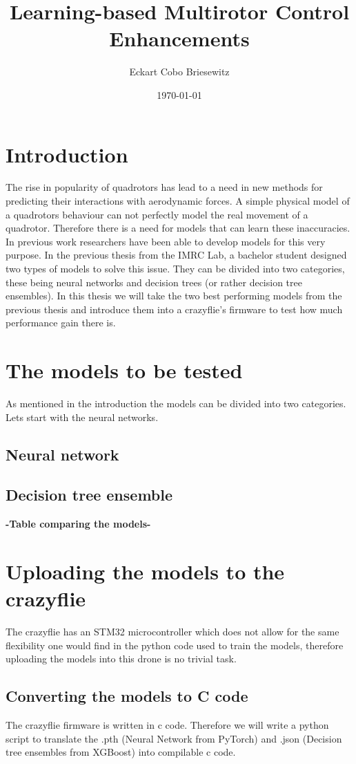 \documentclass[11pt]{article}
\title{ Learning-based Multirotor Control Enhancements }
\author{ Eckart Cobo Briesewitz }
\date{\today}
\begin{document}
\maketitle
\pagebreak


\section{Introduction}
The rise in popularity of quadrotors has lead to a need in new methods for predicting their interactions with aerodynamic forces. A simple physical model of a quadrotors behaviour can not perfectly model the real movement of a quadrotor. Therefore there is a need for models that can learn these inaccuracies. In previous work researchers have been able to develop models for this very purpose. In the previous thesis from the IMRC Lab, a bachelor student designed two types of models to solve this issue. They can be divided into two categories, these being neural networks and decision trees (or rather decision tree ensembles). In this thesis we will take the two best performing models from the previous thesis and introduce them into a crazyflie's firmware to test how much performance gain there is.

\section{The models to be tested}
As mentioned in the introduction the models can be divided into two categories. Lets start with the neural networks.
\subsection{Neural network}
\subsection{Decision tree ensemble}

\textbf{-Table comparing the models-}

\section{Uploading the models to the crazyflie}
The crazyflie has an STM32 microcontroller which does not allow for the same flexibility one would find in the python code used to train the models, therefore uploading the models into this drone is no trivial task.
\subsection{Converting the models to C code}
The crazyflie firmware is written in c code. Therefore we will write a python script to translate the .pth (Neural Network from PyTorch) and .json (Decision tree ensembles from XGBoost) into compilable c code.
\end{document}
